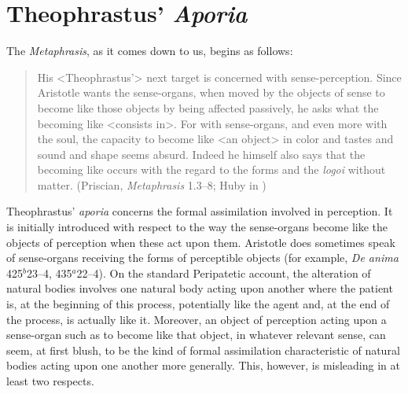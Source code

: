 \documentclass[12pt]{article}
\begin{document}



\section{Theophrastus' \emph{Aporia}} %
\label{sec:theophrastus_emph_aporia}

The \emph{Metaphrasis}, as it comes down to us, begins as follows:
\begin{quote}
	His <Theophrastus'> next target is concerned with sense-perception. Since Aristotle wants the sense-organs, when moved by the objects of sense to become like those objects by being affected passively, he asks what the becoming like <consists in>. For with sense-organs, and even more with the soul, the capacity to become like <an object> in color and tastes and sound and shape seems absurd. Indeed he himself also says that the becoming like occurs with the regard to the forms and the \emph{logoi} without matter. (Priscian, \emph{Metaphrasis} 1.3--8; Huby in \citealt{Sorabji:1997ly})
\end{quote}

Theophrastus' \emph{aporia} concerns the formal assimilation involved in perception. It is initially introduced with respect to the way the sense-organs become like the objects of perception when these act upon them. Aristotle does sometimes speak of sense-organs receiving the forms of perceptible objects (for example, \emph{De anima} 425\( ^{b} \)23--4, 435\( ^{a} \)22--4). On the standard Peripatetic account, the alteration of natural bodies involves one natural body acting upon another where the patient is, at the beginning of this process, potentially like the agent and, at the end of the process, is actually like it. Moreover, an object of perception acting upon a sense-organ such as to become like that object, in whatever relevant sense, can seem, at first blush, to be the kind of formal assimilation characteristic of natural bodies acting upon one another more generally. This, however, is misleading in at least two respects. 
\end{document}

